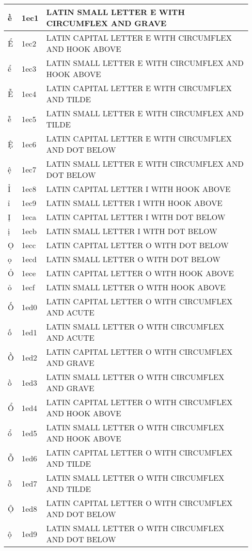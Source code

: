 \documentclass[12pt,letterpaper,openany]{book}
\begin{document}
\begin{center}
\begin{supertabular}{|m{0.25in}|m{0.5in}|m{4in}|}
ề & 1ec1 & LATIN SMALL LETTER E WITH CIRCUMFLEX AND GRAVE\\\hline
Ể & 1ec2 & LATIN CAPITAL LETTER E WITH CIRCUMFLEX AND HOOK ABOVE\\\hline
ể & 1ec3 & LATIN SMALL LETTER E WITH CIRCUMFLEX AND HOOK ABOVE\\\hline
Ễ & 1ec4 & LATIN CAPITAL LETTER E WITH CIRCUMFLEX AND TILDE\\\hline
ễ & 1ec5 & LATIN SMALL LETTER E WITH CIRCUMFLEX AND TILDE\\\hline
Ệ & 1ec6 & LATIN CAPITAL LETTER E WITH CIRCUMFLEX AND DOT BELOW\\\hline
ệ & 1ec7 & LATIN SMALL LETTER E WITH CIRCUMFLEX AND DOT BELOW\\\hline
Ỉ & 1ec8 & LATIN CAPITAL LETTER I WITH HOOK ABOVE\\\hline
ỉ & 1ec9 & LATIN SMALL LETTER I WITH HOOK ABOVE\\\hline
Ị & 1eca & LATIN CAPITAL LETTER I WITH DOT BELOW\\\hline
ị & 1ecb & LATIN SMALL LETTER I WITH DOT BELOW\\\hline
Ọ & 1ecc & LATIN CAPITAL LETTER O WITH DOT BELOW\\\hline
ọ & 1ecd & LATIN SMALL LETTER O WITH DOT BELOW\\\hline
Ỏ & 1ece & LATIN CAPITAL LETTER O WITH HOOK ABOVE\\\hline
ỏ & 1ecf & LATIN SMALL LETTER O WITH HOOK ABOVE\\\hline
Ố & 1ed0 & LATIN CAPITAL LETTER O WITH CIRCUMFLEX AND ACUTE\\\hline
ố & 1ed1 & LATIN SMALL LETTER O WITH CIRCUMFLEX AND ACUTE\\\hline
Ồ & 1ed2 & LATIN CAPITAL LETTER O WITH CIRCUMFLEX AND GRAVE\\\hline
ồ & 1ed3 & LATIN SMALL LETTER O WITH CIRCUMFLEX AND GRAVE\\\hline
Ổ & 1ed4 & LATIN CAPITAL LETTER O WITH CIRCUMFLEX AND HOOK ABOVE\\\hline
ổ & 1ed5 & LATIN SMALL LETTER O WITH CIRCUMFLEX AND HOOK ABOVE\\\hline
Ỗ & 1ed6 & LATIN CAPITAL LETTER O WITH CIRCUMFLEX AND TILDE\\\hline
ỗ & 1ed7 & LATIN SMALL LETTER O WITH CIRCUMFLEX AND TILDE\\\hline
Ộ & 1ed8 & LATIN CAPITAL LETTER O WITH CIRCUMFLEX AND DOT BELOW\\\hline
ộ & 1ed9 & LATIN SMALL LETTER O WITH CIRCUMFLEX AND DOT BELOW\\\hline

\end{supertabular}
\end{center}
\end{document}
